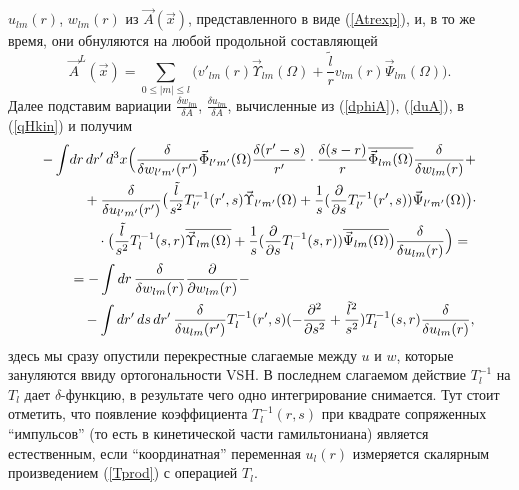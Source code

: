\documentclass[12pt]{article}
\newcommand{\pl}{\partial}
\newcommand{\ol}{\overline}
\begin{document}
$ u_{lm}(r) $,
$ w_{lm}(r) $ из
$ \vec{A}(\vec{x}) $,
    представленного в виде
(\ref{Atrexp}),
    и, в то же время, они обнуляются на любой продольной составляющей
\begin{equation*}
    \vec{A}^{L}(\vec{x}) = \sum_{0\leq |m| \leq l} \bigl(
	v'_{lm}(r)\vec{\Upsilon}_{lm}(\Omega) +\frac{\tilde{l}}{r}v_{lm}(r)
	    \vec{\Psi}_{lm}(\Omega)\bigr) .
\end{equation*}
    Далее подставим вариации
$ \frac{\delta w_{lm}}{\delta A} $,
$ \frac{\delta u_{lm}}{\delta A} $,
    вычисленные из
(\ref{dphiA}),
(\ref{duA}), в
(\ref{qHkin})
    и получим
\begin{align*}
    -\int& dr\, dr'\, d^{3}x \Bigl(\frac{\delta}{\delta w_{l'm'}(r')}
\vec{\Phi}_{l'm'}(\Omega) \frac{\delta(r'-s)}{r'} \cdot
	\frac{\delta(s-r)}{r} \ol{\vec{\Phi}_{lm}(\Omega)}
	    \frac{\delta}{\delta w_{lm}(r)}
    +\\
&\quad +\frac{\delta}{\delta u_{l'm'}(r')}
    \bigl(\frac{\tilde{l}}{s^{2}} T_{l'}^{-1}(r',s)
	\vec{\Upsilon}_{l'm'}(\Omega)
    +\frac{1}{s}(\frac{\pl}{\pl s}T_{l'}^{-1}(r',s))\vec{\Psi}_{l'm'}(\Omega)
	\bigr)\cdot \\
&\quad\quad \cdot \bigl(\frac{\tilde{l}}{s^{2}}T_{l}^{-1}(s,r)
    \ol{\vec{\Upsilon}_{lm}(\Omega)} +\frac{1}{s}(\frac{\pl}{\pl s}
    T_{l}^{-1}(s,r))\ol{\vec{\Psi}_{lm}(\Omega)} \bigr)
	\frac{\delta}{\delta u_{lm}(r)} \Bigr) =\\
&= -\int dr\, \frac{\delta}{\delta w_{lm}(r)} \frac{\pl}{\pl w_{lm}(r)} -\\
&\quad    -\int dr'\, ds\, dr'\, \frac{\delta}{\delta u_{lm}(r')}
    T_{l}^{-1}(r',s)
    (-\frac{\pl^{2}}{\pl s^{2}}+\frac{\tilde{l}^{2}}{s^{2}})
    T_{l}^{-1}(s,r) \frac{\delta}{\delta u_{lm}(r)} ,
\end{align*}
    здесь мы сразу опустили перекрестные слагаемые между
$ u $ и
$ w $,
    которые зануляются ввиду ортогональности VSH.
    В последнем слагаемом действие
$ T_{l}^{-1} $ на
$ T_{l} $
    дает
$ \delta $-функцию, в результате чего одно интегрирование снимается.
    Тут стоит отметить, что появление коэффициента
$ T_{l}^{-1}(r,s) $
    при квадрате сопряженных ``импульсов'' (то есть в кинетической части
    гамильтониана) является естественным,
    если ``координатная'' переменная 
$ u_{l}(r) $
    измеряется скалярным произведением
(\ref{Tprod})
    с операцией
$ T_{l} $.
\end{document}
